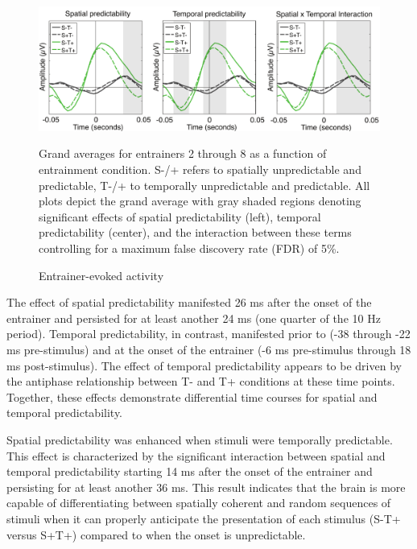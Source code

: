 \documentclass[dwyatte_dissertation.tex]{subfiles}
\begin{document}
\begin{figure}[h!]
\begin{center}
\includegraphics[width=160mm]{figs/chap_pleast/results_entrain_tla_All_montage.pdf}
\end{center}
\caption{Entrainer-evoked activity}{Grand averages for entrainers 2 through 8 as a function of entrainment condition. S-/+ refers to spatially unpredictable and predictable, T-/+ to temporally unpredictable and predictable. All plots depict the grand average with gray shaded regions denoting significant effects of spatial predictability (left), temporal predictability (center), and the interaction between these terms controlling for a maximum false discovery rate (FDR) of 5\%.}
\label{fig:pleast_entrain_tla}
\end{figure}

The effect of spatial predictability manifested 26 ms after the onset of the entrainer and persisted for at least another 24 ms (one quarter of the 10 Hz period). Temporal predictability, in contrast, manifested prior to (-38 through -22 ms pre-stimulus) and at the onset of the entrainer (-6 ms pre-stimulus through 18 ms post-stimulus). The effect of temporal predictability appears to be driven by the antiphase relationship between T- and T+ conditions at these time points. Together, these effects demonstrate differential time courses for spatial and temporal predictability.

Spatial predictability was enhanced when stimuli were temporally predictable. This effect is characterized by the significant interaction between spatial and temporal predictability starting 14 ms after the onset of the entrainer and persisting for at least another 36 ms. This result indicates that the brain is more capable of differentiating between spatially coherent and random sequences of stimuli when it can properly anticipate the presentation of each stimulus (S-T+ versus S+T+) compared to when the onset is unpredictable.
\end{document}
